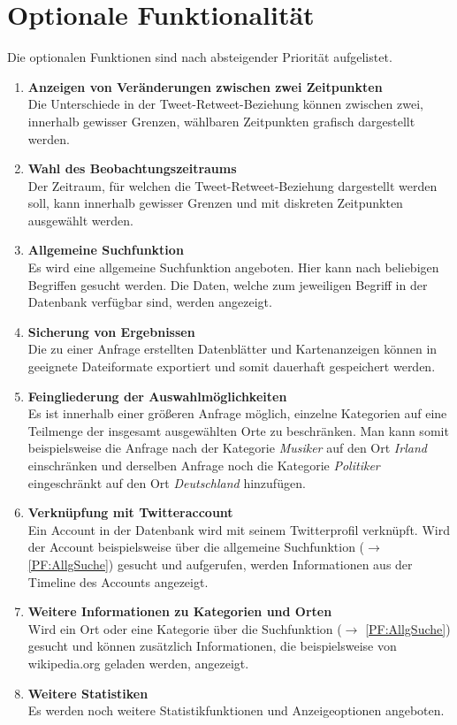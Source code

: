 \section{Optionale Funktionalität}
Die optionalen Funktionen sind nach absteigender Priorität aufgelistet.
\begin{enumerate}[ align=left, label={\textbf{\textbackslash F50\arabic*0\textbackslash}}]
	\item \textbf{Anzeigen von Veränderungen  zwischen zwei Zeitpunkten} \label{PF:Diff} \\
	Die Unterschiede in der Tweet-Retweet-Beziehung können zwischen zwei, innerhalb gewisser Grenzen, wählbaren Zeitpunkten grafisch dargestellt werden.
	\item \textbf{Wahl des Beobachtungszeitraums} \label{PF:WahlZeitraum} \\
	Der Zeitraum, für welchen die Tweet-Retweet-Beziehung dargestellt werden soll, kann innerhalb gewisser Grenzen und mit diskreten Zeitpunkten ausgewählt werden.
	\item \textbf{Allgemeine Suchfunktion} \label{PF:AllgSuche} \\
	Es wird eine allgemeine Suchfunktion angeboten. Hier kann nach beliebigen Begriffen gesucht werden. Die  Daten, welche zum jeweiligen Begriff in der Datenbank verfügbar sind, werden angezeigt.
	\item  \textbf{Sicherung von Ergebnissen} \label{PF:Sicherung} \\
	Die zu einer Anfrage erstellten Datenblätter und Kartenanzeigen können in geeignete Dateiformate exportiert und somit dauerhaft gespeichert werden.
	\item \textbf{Feingliederung der Auswahlmöglichkeiten} \\
	Es ist innerhalb einer größeren Anfrage möglich, einzelne Kategorien auf eine Teilmenge der insgesamt ausgewählten Orte zu beschränken. Man kann somit beispielsweise die Anfrage nach der Kategorie \emph{Musiker} auf den Ort \emph{Irland} einschränken und  derselben Anfrage noch die Kategorie \emph{Politiker} eingeschränkt auf den Ort \emph{Deutschland} hinzufügen.
	\item \textbf{Verknüpfung mit Twitteraccount} \label{PF:Verknuepfung} \\
	Ein Account in der Datenbank wird mit seinem Twitterprofil verknüpft. Wird der Account beispielsweise über die allgemeine Suchfunktion ($\rightarrow$ \ref{PF:AllgSuche}) gesucht und aufgerufen, werden Informationen aus der Timeline des Accounts angezeigt. 
	\item \textbf{Weitere Informationen zu Kategorien und Orten} \label{PF:WeiterInfos} \\
	Wird ein Ort oder eine Kategorie über die Suchfunktion ($\rightarrow$ \ref{PF:AllgSuche}) gesucht und können zusätzlich Informationen, die beispielsweise von wikipedia.org geladen werden, angezeigt.
	
	\item \textbf{Weitere Statistiken} \label{PF:Statistiken} \\
	Es werden noch weitere Statistikfunktionen und Anzeigeoptionen angeboten.
\end{enumerate}
